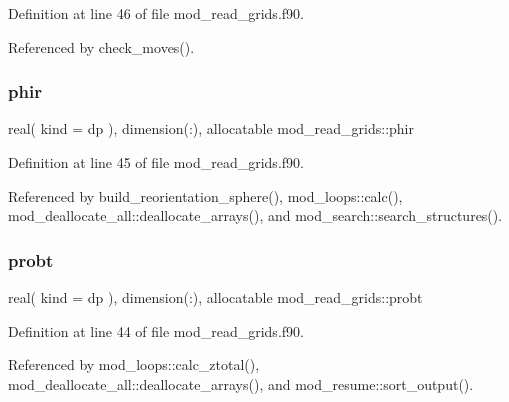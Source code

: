 Definition at line 46 of file mod\+\_\+read\+\_\+grids.\+f90.



Referenced by check\+\_\+moves().

\mbox{\label{namespacemod__read__grids_aa3da94e35a501dc0ed782d7019127514}} 
\subsubsection{\texorpdfstring{phir}{phir}}
{\footnotesize\ttfamily real( kind = dp ), dimension(\+:), allocatable mod\+\_\+read\+\_\+grids\+::phir}



Definition at line 45 of file mod\+\_\+read\+\_\+grids.\+f90.



Referenced by build\+\_\+reorientation\+\_\+sphere(), mod\+\_\+loops\+::calc(), mod\+\_\+deallocate\+\_\+all\+::deallocate\+\_\+arrays(), and mod\+\_\+search\+::search\+\_\+structures().

\mbox{\label{namespacemod__read__grids_a019fc7a33467abb84318794f59bff9cd}} 
\subsubsection{\texorpdfstring{probt}{probt}}
{\footnotesize\ttfamily real( kind = dp ), dimension(\+:), allocatable mod\+\_\+read\+\_\+grids\+::probt}



Definition at line 44 of file mod\+\_\+read\+\_\+grids.\+f90.



Referenced by mod\+\_\+loops\+::calc\+\_\+ztotal(), mod\+\_\+deallocate\+\_\+all\+::deallocate\+\_\+arrays(), and mod\+\_\+resume\+::sort\+\_\+output().

\mbox{\label{namespacemod__read__grids_aca954e32e5f53302912f372a99affe97}} 

